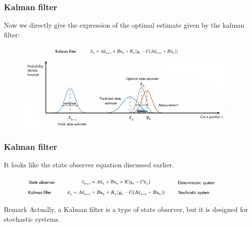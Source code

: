 \documentclass{beamer}
\begin{document}

\begin{frame}
	\frametitle{Kalman filter}
	Now we directly give the expression of the optimal estimate given by the kalman filter:
	\begin{figure}
		\centering
		\includegraphics[width=11.5cm]{kf_algorithm.png}\\
		\includegraphics[width=11cm]{kf_algorithm1.png}
	\end{figure}

\end{frame}

\begin{frame}
	\frametitle{Kalman filter}
	It looks like the state observer equation discussed earlier. 
	\begin{figure}
		\centering
		\includegraphics[width=10.5cm]{observer_kalman.png}
	\end{figure}
	\begin{block}{Remark}
		Actually, a Kalman filter is a type of state observer, but it is designed for stochastic systems. 
	\end{block}
\end{frame}
\end{document}
